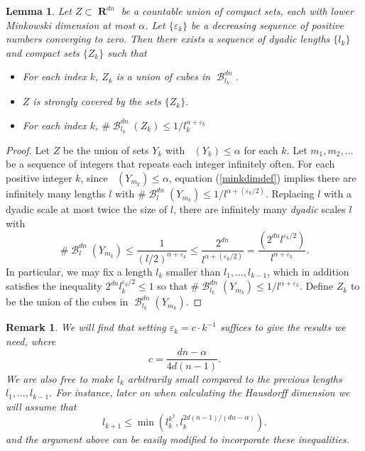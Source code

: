 \documentclass[dvipsnames,letterpaper,12pt]{article}
\theoremstyle{plain}
\newtheorem{lemma}{Lemma}
\newtheorem*{remark}{Remark}
\DeclareMathOperator{\lowminkdim}{\underline{\dim}_{\mathbf{M}}}
\DeclareMathOperator{\RR}{\mathbf{R}}
\DeclareMathOperator{\B}{\mathcal{B}}
\begin{document}
\begin{lemma} \label{coveringlemma}
	Let $Z \subset \RR^{dn}$ be a countable union of compact sets, each with lower Minkowski dimension at most $\alpha$. Let $\{ \varepsilon_k \}$ be a decreasing sequence of positive numbers converging to zero. Then there exists a sequence of dyadic lengths $\{ l_k \}$ and compact sets $\{ Z_k \}$ such that
	\begin{itemize}
		\item[\emph{(a)}] For each index $k$, $Z_k$ is a union of cubes in $\B^{dn}_{l_k}$.
		\item[\emph{(b)}] $Z$ is strongly covered by the sets $\{ Z_k \}$.
		\item[\emph{(c)}] For each index $k$, $\# \B^{dn}_{l_k}(Z_k) \leq 1/l_k^{\alpha + \varepsilon_k}$
	\end{itemize}
\end{lemma}
\begin{proof}
	Let $Z$ be the union of sets $Y_k$ with $\lowminkdim(Y_k) \leq \alpha$ for each $k$. Let $m_1, m_2, \dots$ be a sequence of integers that repeats each integer infinitely often. For each positive integer $k$, since $\lowminkdim(Y_{m_k}) \leq \alpha$, equation (\ref{minkdimdef}) implies there are infinitely many lengths $l$ with $\# \B_l^{dn}(Y_{m_k}) \leq 1/l^{\alpha + (\varepsilon_k/2)}$. Replacing $l$ with a dyadic scale at most twice the size of $l$, there are infinitely many {\it dyadic} scales $l$ with
	\[ \# \B^{dn}_l(Y_{m_k}) \leq \frac{1}{(l/2)^{\alpha + \varepsilon_k}} \leq \frac{2^{dn}}{l^{\alpha + (\varepsilon_k/2)}} = \frac{\left( 2^{dn} l^{\varepsilon_k/2} \right)}{l^{\alpha + \varepsilon_k}}. \]
	In particular, we may fix a length $l_k$ smaller than $l_1, \dots, l_{k-1}$, which in addition satisfies the inequality $2^{dn} l^{\varepsilon_k/2}_k \leq 1$ so that $\# \B^{dn}_{l_k}(Y_{m_k}) \leq 1/l^{\alpha + \varepsilon_k}$. Define $Z_k$ to be the union of the cubes in $\B_{l_k}^{dn}(Y_{m_k})$.
\end{proof}

\begin{remark}
	We will find that setting $\varepsilon_k = c \cdot k^{-1}$ suffices to give the results we need, where
	\[ c = \frac{dn - \alpha}{4d(n-1)}. \]
	We are also free to make $l_k$ arbitrarily small compared to the previous lengths $l_1, \dots, l_{k-1}$. For instance, later on when calculating the Hausdorff dimension we will assume that
	\begin{equation} \label{lbounds}
		l_{k+1} \leq \min \left( l_k^{k^2}, l_k^{2d(n-1)/(dn - \alpha)} \right).
	\end{equation}
	and the argument above can be easily modified to incorporate these inequalities.
\end{remark}
\end{document}
